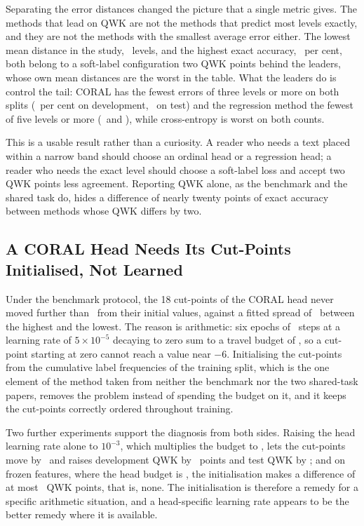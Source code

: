 Separating the error distances changed the picture that a single metric gives. The methods that
lead on QWK are not the methods that predict most levels exactly, and they are not the methods
with the smallest average error either. The lowest mean distance in the study,
\devDistSoftTwo\ levels, and the highest exact accuracy, \devAccSoftTwo\ per cent, both belong
to a soft-label configuration two QWK points behind the leaders, whose own mean distances are
the worst in the table. What the leaders do is control the tail: CORAL has the fewest errors of
three levels or more on both splits (\devFarThreeCoral\ per cent on development,
\testFarThreeCoral\ on test) and the regression method the fewest of five levels or more
(\devFarFiveMSE\ and \testFarFiveMSE), while cross-entropy is worst on both counts.

This is a usable result rather than a curiosity. A reader who needs a text placed within a
narrow band should choose an ordinal head or a regression head; a reader who needs the exact
level should choose a soft-label loss and accept two QWK points less agreement. Reporting QWK
alone, as the benchmark and the shared task do, hides a difference of nearly twenty points of
exact accuracy between methods whose QWK differs by two.

\subsection{A CORAL Head Needs Its Cut-Points Initialised, Not Learned}

Under the benchmark protocol, the 18 cut-points of the CORAL head never moved further than
\cutMoveFineCoral\ from their initial values, against a fitted spread of \cutSpreadCoral\
between the highest and the lowest. The reason is arithmetic: six epochs of \stepsPerEpoch\
steps at a learning rate of $5\times10^{-5}$ decaying to zero sum to a travel budget of
\lrSumEncoder, so a cut-point starting at zero cannot reach a value near $-6$. Initialising the
cut-points from the cumulative label frequencies of the training split, which is the one
element of the method taken from neither the benchmark nor the two shared-task papers, removes
the problem instead of spending the budget on it, and it keeps the cut-points correctly ordered
throughout training.

Two further experiments support the diagnosis from both sides. Raising the head learning rate
alone to $10^{-3}$, which multiplies the budget to \lrSumHeadlr, lets the cut-points move by
\cutMoveCoralHeadlr\ and raises development QWK by \coralHeadlrDevGain\ points and test QWK by
\coralHeadlrTestGain; and on frozen features, where the head budget is \cpuLrSum, the
initialisation makes a difference of at most \cpuZeroInitDiffMean\ QWK points, that is, none.
The initialisation is therefore a remedy for a specific arithmetic situation, and a
head-specific learning rate appears to be the better remedy where it is available.

